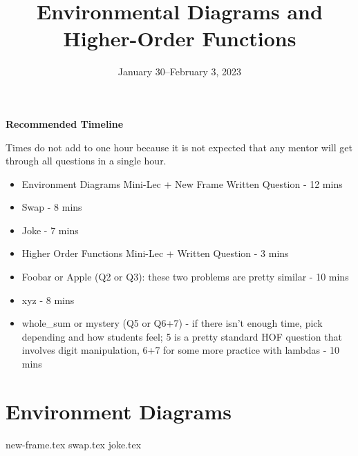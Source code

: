 \documentclass{exam}
\title{Environmental Diagrams \titlebreak and Higher-Order Functions}
\date{January 30--February 3, 2023}
\begin{document}
\maketitle

\begin{blocksection}
\begin{guide}
\textbf{Recommended Timeline}

Times do not add to one hour because it is not expected that any mentor will get through all questions in a single hour. 

\begin{itemize}
    \item Environment Diagrams Mini-Lec + New Frame Written Question - 12 mins
    \item Swap - 8 mins
    \item Joke - 7 mins
    \item Higher Order Functions Mini-Lec + Written Question - 3 mins
    \item Foobar or Apple (Q2 or Q3): these two problems are pretty similar - 10 mins
    \item xyz - 8 mins
    \item whole\_sum or mystery (Q5 or Q6+7) - if there isn't enough time, pick depending and how students feel;
    5 is a pretty standard HOF question that involves digit manipulation, 6+7 for some more practice with lambdas - 10 mins
\end{itemize}
\end{guide}
\end{blocksection}


\section{Environment Diagrams}

\begin{questions}
{new-frame.tex}
{swap.tex}
{joke.tex}
\end{questions}
\end{document}
